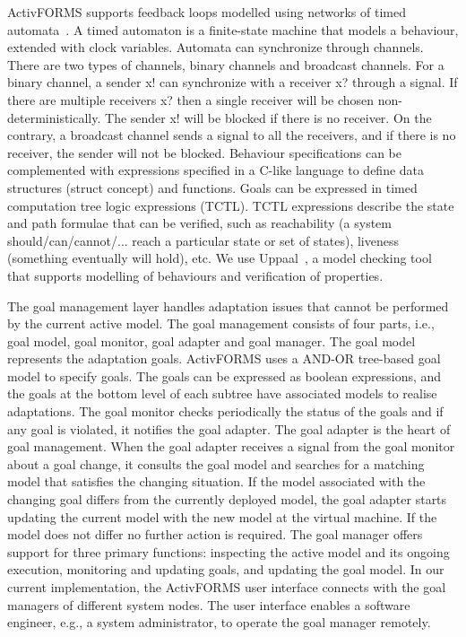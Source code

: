 ActivFORMS supports feedback loops modelled using networks of timed automata~\cite{Alur1990}. A timed automaton is a finite-state machine that models a behaviour, extended with clock variables. Automata can synchronize through channels. There are two types of channels, binary channels and broadcast channels. For a binary channel, a sender x! can synchronize with a receiver x? through a signal. If there are multiple receivers x? then a single receiver will be chosen non-deterministically. The sender x! will be blocked if there is no receiver. On the contrary, a broadcast channel sends a signal to all the receivers, and if there is no receiver, the sender will not be blocked. Behaviour specifications can be complemented with expressions specified in a C-like language to define data structures (struct concept) and functions. Goals can be expressed in timed computation tree logic expressions (TCTL). TCTL expressions describe the state and path formulae that can be verified, such as reachability (a system should/can/cannot/... reach a particular state or set of states), liveness (something eventually will hold), etc. We use Uppaal~\cite{Behrmann2004}, a model checking tool that supports modelling of behaviours and verification of properties.

The goal management layer handles adaptation issues that cannot be performed by the current active model. The goal management consists of four parts, i.e., goal model, goal monitor, goal adapter and goal manager. The goal model represents the adaptation goals. ActivFORMS uses a AND-OR tree-based goal model to specify goals. The goals can be expressed as boolean expressions, and the goals at the bottom level of each subtree have associated models to realise adaptations. The goal monitor checks periodically the status of the goals and if any goal is violated, it notifies the goal adapter. The goal adapter is the heart of goal management. When the goal adapter receives a signal  from the goal monitor about a goal change, it consults the goal model and searches for a matching model that satisfies the changing situation. If the model associated with the changing goal differs from the currently deployed model, the goal adapter starts updating the current model with the new model at the virtual machine. If the model does not differ no further action is required. The goal manager offers support for three primary functions: inspecting the active model and its ongoing execution, monitoring and updating goals, and updating the goal model. In our current implementation, the ActivFORMS user interface connects with the goal managers of different system nodes. The user interface enables a software engineer, e.g., a system administrator, to operate the goal manager remotely.
